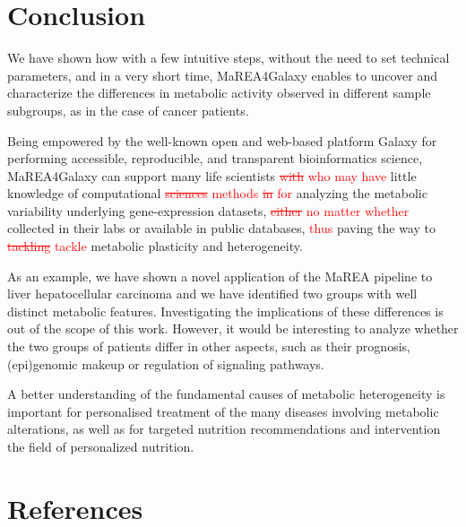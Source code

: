 \documentclass[preprint,12pt,authoryear]{elsarticle}
\newcommand{\red}{\textcolor{red}}
\newcommand{\mareagalaxy}{\textsf{MaREA4Galaxy}}
\newcommand{\mareaTool}{\textsf{MaREA}}
\begin{document}
\section{Conclusion}

We have shown how with a few intuitive steps, without the need to set
technical parameters, and in a very short time, \mareagalaxy{} enables
to uncover and characterize the differences in metabolic activity
observed in different sample subgroups, as in the case of cancer
patients.

Being empowered by the well-known open and web-based platform Galaxy
for performing accessible, reproducible, and transparent
bioinformatics science, \mareagalaxy{} can support many life
scientists \red{\sout{with} who may have} little knowledge of
computational \red{\sout{sciences} methods \sout{in} for} analyzing
the metabolic variability underlying gene-expression datasets,
\red{\sout{either} no matter whether} collected in their labs or
available in public databases, \red{thus} paving the way to
\red{\sout{tackling} tackle} metabolic plasticity and heterogeneity.

As an example, we have shown a novel application of the \mareaTool{}
pipeline to liver hepatocellular carcinoma and we have identified two
groups with well distinct metabolic features. Investigating the
implications of these differences is out of the scope of this
work. However, it would be interesting to analyze whether the two
groups of patients differ in other aspects, such as their prognosis,
(epi)genomic makeup or regulation of signaling pathways.

A better understanding of the fundamental causes of metabolic
heterogeneity is important for personalised treatment of the many
diseases involving metabolic alterations, as well as for targeted
nutrition recommendations and intervention the field of personalized
nutrition.





\clearpage

\section*{References}

 

\end{document}
